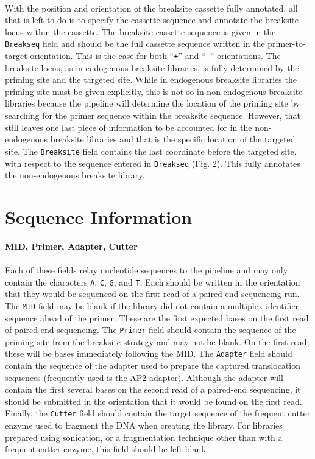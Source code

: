 \documentclass{article}
\begin{document}
\paragraph{} With the position and orientation of the breaksite cassette fully annotated, all that is left to do is to specify the cassette sequence and annotate the breaksite locus within the cassette. The breaksite cassette sequence is given in the \texttt{Breakseq} field and should be the full cassette sequence written in the primer-to-target orientation. This is the case for both ``\texttt{+}'' and ``\texttt{-}'' orientations. The breaksite locus, as in endogenous breaksite libraries, is fully determined by the priming site and the targeted site. While in endogenous breaksite libraries the priming site must be given explicitly, this is not so in non-endogenous breaksite libraries because the pipeline will determine the location of the priming site by searching for the primer sequence within the breaksite sequence. However, that still leaves one last piece of information to be accounted for in the non-endogenous breaksite libraries and that is the specific location of the targeted site. The \texttt{Breaksite} field contains the last coordinate before the targeted site, with respect to the sequence entered in \texttt{Breakseq} (Fig. 2). This fully annotates the non-endogenous breaksite library.


\section{Sequence Information}
\textbf{MID, Primer, Adapter, Cutter}
\paragraph{} Each of these fields relay nucleotide sequences to the pipeline and may only contain the characters \texttt{A}, \texttt{C}, \texttt{G}, and \texttt{T}. Each should be written in the orientation that they would be sequenced on the first read of a paired-end sequencing run. The \texttt{MID} field may be blank if the library did not contain a multiplex identifier sequence ahead of the primer. These are the first expected bases on the first read of paired-end sequencing. The \texttt{Primer} field should contain the sequence of the priming site from the breaksite strategy and may not be blank. On the first read, these will be bases immediately following the MID. The \texttt{Adapter} field should contain the sequence of the adapter used to prepare the captured translocation sequences (frequently used is the AP2 adapter). Although the adapter will contain the first several bases on the second read of a paired-end sequencing, it should be submitted in the orientation that it would be found on the first read. Finally, the \texttt{Cutter} field should contain the target sequence of the frequent cutter enzyme used to fragment the DNA when creating the library. For libraries prepared using sonication, or a fragmentation technique other than with a frequent cutter enzyme, this field should be left blank. 
\end{document}
